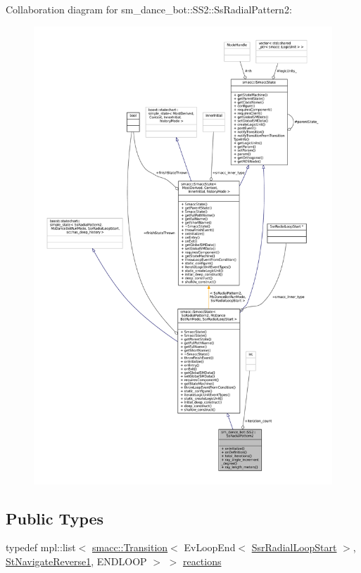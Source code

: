Collaboration diagram for sm\+\_\+dance\+\_\+bot\+:\+:S\+S2\+:\+:Ss\+Radial\+Pattern2\+:
\nopagebreak
\begin{figure}[H]
\begin{center}
\leavevmode
\includegraphics[width=350pt]{structsm__dance__bot_1_1SS2_1_1SsRadialPattern2__coll__graph}
\end{center}
\end{figure}
\subsection*{Public Types}
\begin{DoxyCompactItemize}
\item 
typedef mpl\+::list$<$ \hyperlink{classsmacc_1_1Transition}{smacc\+::\+Transition}$<$ Ev\+Loop\+End$<$ \hyperlink{structsm__dance__bot_1_1radial__motion__states_1_1SsrRadialLoopStart}{Ssr\+Radial\+Loop\+Start} $>$, \hyperlink{structsm__dance__bot_1_1StNavigateReverse1}{St\+Navigate\+Reverse1}, E\+N\+D\+L\+O\+OP $>$ $>$ \hyperlink{structsm__dance__bot_1_1SS2_1_1SsRadialPattern2_ab6b8f0227a267c7618f03efefe3fcf16}{reactions}
\end{DoxyCompactItemize}
